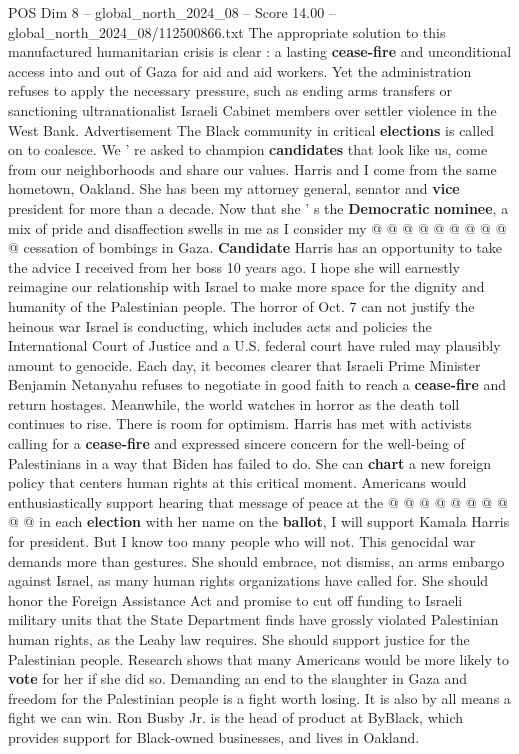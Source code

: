 \begin{textsample}{POS Dim 8 – global\_north\_2024\_08 – Score 14.00 – global\_north\_2024\_08/112500866.txt}
The appropriate solution to this manufactured humanitarian crisis is clear : a lasting \textbf{cease-fire} and unconditional access into and out of Gaza for aid and aid workers.
Yet the administration refuses to apply the necessary pressure, such as ending arms transfers or sanctioning ultranationalist Israeli Cabinet members over settler violence in the West Bank.
Advertisement The Black community in critical \textbf{elections} is called on to coalesce.
We ' re asked to champion \textbf{candidates} that look like us, come from our neighborhoods and share our values.
Harris and I come from the same hometown, Oakland.
She has been my attorney general, senator and \textbf{vice} president for more than a decade.
Now that she ' s the \textbf{Democratic} \textbf{nominee}, a mix of pride and disaffection swells in me as I consider my @ @ @ @ @ @ @ @ @ @ cessation of bombings in Gaza. \textbf{Candidate} Harris has an opportunity to take the advice I received from her boss 10 years ago.
I hope she will earnestly reimagine our relationship with Israel to make more space for the dignity and humanity of the Palestinian people.
The horror of Oct. 7 can not justify the heinous war Israel is conducting, which includes acts and policies the International Court of Justice and a U.S. federal court have ruled may plausibly amount to genocide.
Each day, it becomes clearer that Israeli Prime Minister Benjamin Netanyahu refuses to negotiate in good faith to reach a \textbf{cease-fire} and return hostages.
Meanwhile, the world watches in horror as the death toll continues to rise.
There is room for optimism.
Harris has met with activists calling for a \textbf{cease-fire} and expressed sincere concern for the well-being of Palestinians in a way that Biden has failed to do.
She can \textbf{chart} a new foreign policy that centers human rights at this critical moment.
Americans would enthusiastically support hearing that message of peace at the @ @ @ @ @ @ @ @ @ @ in each \textbf{election} with her name on the \textbf{ballot}, I will support Kamala Harris for president.
But I know too many people who will not.
This genocidal war demands more than gestures.
She should embrace, not dismiss, an arms embargo against Israel, as many human rights organizations have called for.
She should honor the Foreign Assistance Act and promise to cut off funding to Israeli military units that the State Department finds have grossly violated Palestinian human rights, as the Leahy law requires.
She should support justice for the Palestinian people.
Research shows that many Americans would be more likely to \textbf{vote} for her if she did so.
Demanding an end to the slaughter in Gaza and freedom for the Palestinian people is a fight worth losing.
It is also by all means a fight we can win.
Ron Busby Jr. is the head of product at ByBlack, which provides support for Black-owned businesses, and lives in Oakland.

\end{textsample}
